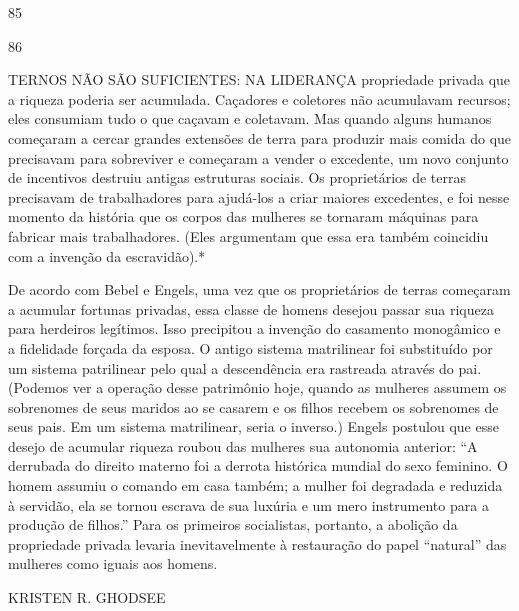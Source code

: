  \par 
85
 \par 
86
 \par 
TERNOS NÃO SÃO SUFICIENTES: NA LIDERANÇA propriedade privada que a riqueza poderia ser acumulada. Caçadores e coletores não acumulavam recursos; eles consumiam tudo o que caçavam e coletavam. Mas quando alguns humanos começaram a cercar grandes extensões de terra para produzir mais comida do que precisavam para sobreviver e começaram a vender o excedente, um novo conjunto de incentivos destruiu antigas estruturas sociais. Os proprietários de terras precisavam de trabalhadores para ajudá-los a criar maiores excedentes, e foi nesse momento da história que os corpos das mulheres se tornaram máquinas para fabricar mais trabalhadores. (Eles argumentam que essa era também coincidiu com a invenção da escravidão).*
 \par 
De acordo com Bebel e Engels, uma vez que os proprietários de terras começaram a acumular fortunas privadas, essa classe de homens desejou passar sua riqueza para herdeiros legítimos. Isso precipitou a invenção do casamento monogâmico e a fidelidade forçada da esposa. O antigo sistema matrilinear foi substituído por um sistema patrilinear pelo qual a descendência era rastreada através do pai. (Podemos ver a operação desse patrimônio hoje, quando as mulheres assumem os sobrenomes de seus maridos ao se casarem e os filhos recebem os sobrenomes de seus pais. Em um sistema matrilinear, seria o inverso.) Engels postulou que esse desejo de acumular riqueza roubou das mulheres sua autonomia anterior: “A derrubada do direito materno foi a derrota histórica mundial do sexo feminino. O homem assumiu o comando em casa também; a mulher foi degradada e reduzida à servidão, ela se tornou escrava de sua luxúria e um mero instrumento para a produção de filhos.” Para os primeiros socialistas, portanto, a abolição da propriedade privada levaria inevitavelmente à restauração do papel “natural” das mulheres como iguais aos homens.
 \par 
KRISTEN R. GHODSEE
 \par 

